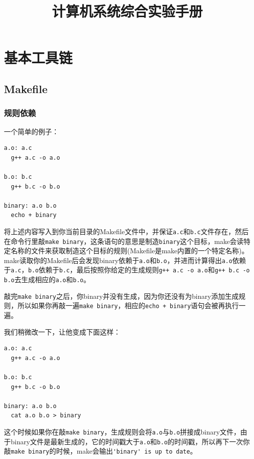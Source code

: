 \documentclass[lang=cn,11pt,a4paper]{elegantpaper}
\title{计算机系统综合实验手册}
\begin{document}
\maketitle

\tableofcontents

\newpage

\section{基本工具链}

\subsection{Makefile}\label{Makefile}

\subsubsection{规则依赖}

一个简单的例子：
\begin{lstlisting}
a.o: a.c
  g++ a.c -o a.o

b.o: b.c
  g++ b.c -o b.o

binary: a.o b.o
  echo + binary
\end{lstlisting}

将上述内容写入到你当前目录的Makefile文件中，并保证\lstinline!a.c!和\lstinline!b.c!文件存在，然后在命令行里敲\lstinline!make binary!，这条语句的意思是制造\lstinline!binary!这个目标，make会读特定名称的文件来获取制造这个目标的规则(Makefile是make内置的一个特定名称)。make读取你的Makefile后会发现binary依赖于\lstinline!a.o!和\lstinline!b.o!，并进而计算得出\lstinline!a.o!依赖于\lstinline!a.c!，\lstinline!b.o!依赖于\lstinline!b.c!，最后按照你给定的生成规则\lstinline!g++ a.c -o a.o!和\lstinline!g++ b.c -o b.o!去生成相应的\lstinline!a.o!和\lstinline!b.o!。

敲完\lstinline!make binary!之后，你binary并没有生成，因为你还没有为binary添加生成规则，所以如果你再敲一遍\lstinline!make binary!，相应的\lstinline!echo + binary!语句会被再执行一遍。

我们稍微改一下，让他变成下面这样：
\begin{lstlisting}
a.o: a.c
  g++ a.c -o a.o

b.o: b.c
  g++ b.c -o b.o

binary: a.o b.o
  cat a.o b.o > binary
\end{lstlisting}

这个时候如果你在敲\lstinline!make binary!，生成规则会将\lstinline!a.o!与\lstinline!b.o!拼接成binary文件，由于binary文件是最新生成的，它的时间戳大于\lstinline!a.o!和\lstinline!b.o!的时间戳，所以再下一次你敲\lstinline!make binary!的时候，make会输出\lstinline!'binary' is up to date!。
\end{document}
